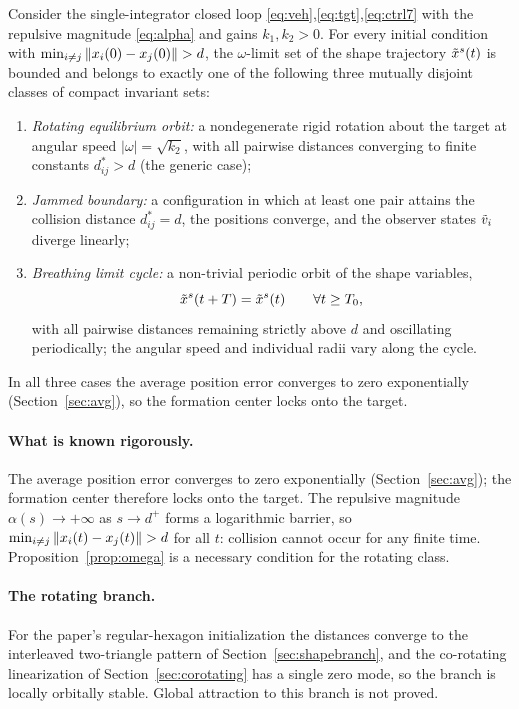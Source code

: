 \begin{conjecture}[Trichotomy]\label{conj:dist}
Consider the single-integrator closed loop \eqref{eq:veh},\eqref{eq:tgt},\eqref{eq:ctrl7} with the
repulsive magnitude \eqref{eq:alpha} and gains $k_1,k_2>0$. For every initial condition with
$\min_{i\ne j}\norm{x_i(0)-x_j(0)}>d$, the $\omega$-limit set of the shape trajectory
$\tilde{x}^s(t)$ is bounded and belongs to exactly one of the following three mutually disjoint
classes of compact invariant sets:
\begin{enumerate}[leftmargin=2.5em]
  \item \emph{Rotating equilibrium orbit:} a nondegenerate rigid rotation about the target at
        angular speed $|\omega|=\sqrt{k_2}$, with all pairwise distances converging to finite
        constants $d_{ij}^*>d$ (the generic case);
  \item \emph{Jammed boundary:} a configuration in which at least one pair attains the collision
        distance $d_{ij}^*=d$, the positions converge, and the observer states $\tilde{v}_i$ diverge
        linearly;
  \item \emph{Breathing limit cycle:} a non-trivial periodic orbit of the shape variables,
        \[\tilde{x}^s(t+T)=\tilde{x}^s(t)\qquad\forall t\ge T_0,\]
        with all pairwise distances remaining strictly above $d$ and oscillating periodically;
        the angular speed and individual radii vary along the cycle.
\end{enumerate}
In all three cases the average position error converges to zero exponentially
(Section~\ref{sec:avg}), so the formation center locks onto the target.
\end{conjecture}

\paragraph{What is known rigorously.} The average position error converges to zero exponentially
(Section~\ref{sec:avg}); the formation center therefore locks onto the target. The repulsive
magnitude $\alpha(s)\to+\infty$ as $s\to d^+$ forms a logarithmic barrier, so
$\min_{i\ne j}\norm{x_i(t)-x_j(t)}>d$ for all $t$: collision cannot occur for any finite time.
Proposition~\ref{prop:omega} is a necessary condition for the rotating class.

\paragraph{The rotating branch.} For the paper's regular-hexagon initialization the distances converge
to the interleaved two-triangle pattern of Section~\ref{sec:shapebranch}, and the co-rotating
linearization of Section~\ref{sec:corotating} has a single zero mode, so the branch is locally orbitally
stable. Global attraction to this branch is not proved.

